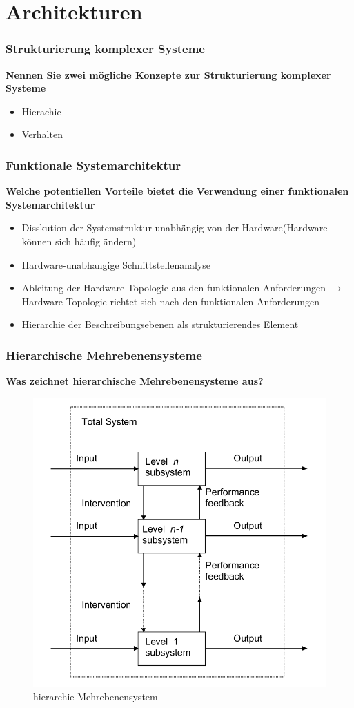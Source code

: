 \part{Architekturen}
\section{Strukturierung komplexer Systeme}
\textbf{Nennen Sie zwei mögliche Konzepte zur Strukturierung komplexer Systeme}
\begin{itemize}
    \item Hierachie
    \item Verhalten
\end{itemize}

\section{Funktionale Systemarchitektur}
\textbf{Welche potentiellen Vorteile bietet die Verwendung einer funktionalen Systemarchitektur}
\begin{itemize}
    \item Disskution der Systemstruktur unabhängig von der Hardware(Hardware können sich häufig ändern)
    \item Hardware-unabhangige Schnittstellenanalyse
    \item Ableitung der Hardware-Topologie aus den funktionalen Anforderungen $\rightarrow$ Hardware-Topologie richtet sich nach den funktionalen Anforderungen
    \item Hierarchie der Beschreibungsebenen als strukturierendes Element
\end{itemize}

\section{Hierarchische Mehrebenensysteme}
\textbf{Was zeichnet hierarchische Mehrebenensysteme aus?}
\begin{figure}[H]
    \centering
    \includegraphics[width=.3\linewidth]{Graphics/hierarchie_mehrebenensystem.png}
    \caption{hierarchie Mehrebenensystem}
\end{figure}

